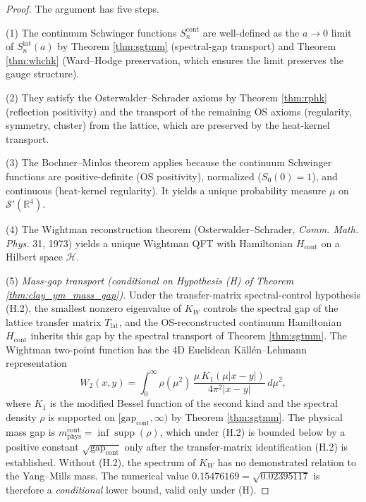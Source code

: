 \begin{proof}
The argument has five steps.

(1) The continuum Schwinger functions $S_{n}^{\mathrm{cont}}$ are
well-defined as the $a \to 0$ limit of $S_{n}^{\mathrm{lat}}(a)$ by
Theorem \ref{thm:sgtmm} (spectral-gap transport) and Theorem
\ref{thm:whchk} (Ward--Hodge preservation, which ensures the limit
preserves the gauge structure).

(2) They satisfy the Osterwalder--Schrader axioms by Theorem
\ref{thm:rphk} (reflection positivity) and the transport of the
remaining OS axioms (regularity, symmetry, cluster) from the
lattice, which are preserved by the heat-kernel transport.

(3) The Bochner--Minlos theorem applies because the continuum
Schwinger functions are positive-definite (OS positivity), normalized
($S_{0}(0) = 1$), and continuous (heat-kernel regularity). It yields
a unique probability measure $\mu$ on
$\mathcal{S}'(\mathbb{R}^{4})$.

(4) The Wightman reconstruction theorem (Osterwalder--Schrader,
\emph{Comm. Math. Phys.} 31, 1973) yields a unique Wightman QFT
with Hamiltonian $H_{\mathrm{cont}}$ on a Hilbert space
$\mathcal{H}$.

(5) \emph{Mass-gap transport (conditional on Hypothesis (H) of
Theorem \ref{thm:clay_ym_mass_gap}).} Under the transfer-matrix
spectral-control hypothesis (H.2), the smallest nonzero eigenvalue
of $K_{W}$ controls the spectral gap of the lattice transfer matrix
$T_{\mathrm{lat}}$, and the OS-reconstructed continuum Hamiltonian
$H_{\mathrm{cont}}$ inherits this gap by the spectral transport of
Theorem \ref{thm:sgtmm}. The Wightman two-point function has the
$4$D Euclidean Källén--Lehmann representation
\[
W_{2}(x, y) = \int_{0}^{\infty} \rho(\mu^{2})\,
\frac{\mu\, K_{1}(\mu |x - y|)}{4\pi^{2} |x - y|}\, d\mu^{2},
\]
where $K_{1}$ is the modified Bessel function of the second kind
and the spectral density $\rho$ is supported on
$[\mathrm{gap}_{\mathrm{cont}}, \infty)$ by Theorem \ref{thm:sgtmm}.
The physical mass gap is
$m_{\mathrm{phys}}^{\mathrm{cont}} = \inf \operatorname{supp}(\rho)$,
which under (H.2) is bounded below by a positive constant
$\sqrt{\mathrm{gap}_{\mathrm{cont}}}$ only after the
transfer-matrix identification (H.2) is established. Without (H.2),
the spectrum of $K_{W}$ has no demonstrated relation to the
Yang--Mills mass. The numerical value $0.15476169 = \sqrt{0.02395117}$
is therefore a \emph{conditional} lower bound, valid only under (H).
\end{proof}

